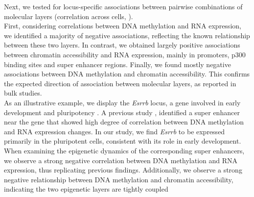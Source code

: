Next, we tested for locus-specific associations between pairwise combinations of molecular layers (correlation across cells, ).\\
First, considering correlations between DNA methylation and RNA expression, we identified a majority of negative associations, reflecting the known relationship between these two layers. In contrast, we obtained largely positive associations between chromatin accessibility and RNA expression, mainly in promoters, p300 binding sites and super enhancer regions. Finally, we found mostly negative associations between DNA methylation and chromatin accessibility. This confirms the expected direction of association between molecular layers, as reported in bulk studies.\\
As an illustrative example, we display the \textit{Esrrb} locus, a gene involved in early development and pluripotency \cite{Papp2012}. A previous study \cite{Angermueller2016}, identified a super enhancer near the gene that showed high degree of correlation between DNA methylation and RNA expression changes. In our study, we find \textit{Esrrb} to be expressed primarily in the pluripotent cells, consistent with its role in early development. When examining the epigenetic dynamics of the corresponding super enhancers, we observe a strong negative correlation between DNA methylation and RNA expression, thus replicating previous findings. Additionally, we observe a strong negative relationship between DNA methylation and chromatin accessibility, indicating the two epigenetic layers are tightly coupled

